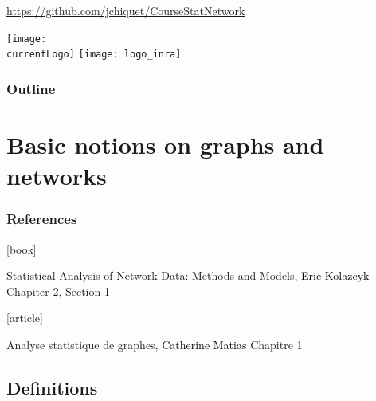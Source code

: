 \documentclass{beamer}\usepackage[]{graphicx}\usepackage[]{color}
\title{\currentCourse}
\subtitle{\huge\currentChapter\normalsize}
\institute{\currentInstitute}
\date{\currentDate}
\def\currentLogo{../common_figs/logo_ensai}
\newcommand{\dotitlepage}{%
  \begin{frame}
    \titlepage
    \vfill
    \begin{center}
        \scriptsize\url{https://github.com/jchiquet/CourseStatNetwork}
    \end{center}
    \vfill
    \texttt{[image: \\currentLogo]}\hfill
    \texttt{[image: logo\_inra]}
  \end{frame}
}
\begin{document}
\dotitlepage

\begin{frame}
  \frametitle{Outline}
  \tableofcontents
\end{frame}

\section{Basic notions on graphs and networks}

\begin{frame} 
  \frametitle{References}

    \begin{thebibliography}{99}
      [book]

     Statistical Analysis of Network Data: Methods and Models, 
    \newblock \textcolor{black}{Eric Kolazcyk} 
    \newblock \alert{Chapiter 2, Section 1}

      [article]

     Analyse statistique de graphes, 
    \newblock \textcolor{black}{Catherine Matias}
    \newblock \alert{Chapitre 1}    

    \end{thebibliography}

\end{frame}

\subsection{Definitions}
\end{document}
